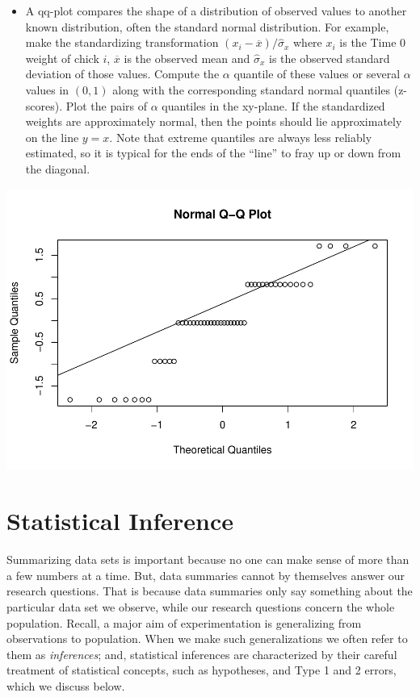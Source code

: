 \documentclass[
]{book}
\begin{document}
\begin{itemize}
\item
  A qq-plot compares the shape of a distribution of observed values to another known distribution, often the standard normal distribution. For example, make the standardizing transformation \((x_i - \overline x) / \hat\sigma_x\) where \(x_i\) is the Time 0 weight of chick \(i\), \(\overline x\) is the observed mean and \(\hat\sigma_x\) is the observed standard deviation of those values. Compute the \(\alpha\) quantile of these values or several \(\alpha\) values in \((0,1)\) along with the corresponding standard normal quantiles (z-scores). Plot the pairs of \(\alpha\) quantiles in the xy-plane. If the standardized weights are approximately normal, then the points should lie approximately on the line \(y=x\). Note that extreme quantiles are always less reliably estimated, so it is typical for the ends of the ``line'' to fray up or down from the diagonal.
\end{itemize}

\includegraphics{01-intro_files/figure-latex/unnamed-chunk-4-1.pdf}

\hypertarget{statistical-inference}{%
\section{Statistical Inference}\label{statistical-inference}}

Summarizing data sets is important because no one can make sense of more than a few numbers at a time. But, data summaries cannot by themselves answer our research questions. That is because data summaries only say something about the particular data set we observe, while our research questions concern the whole population. Recall, a major aim of experimentation is generalizing from observations to population. When we make such generalizations we often refer to them as \emph{inferences}; and, statistical inferences are characterized by their careful treatment of statistical concepts, such as hypotheses, and Type 1 and 2 errors, which we discuss below.
\end{document}
